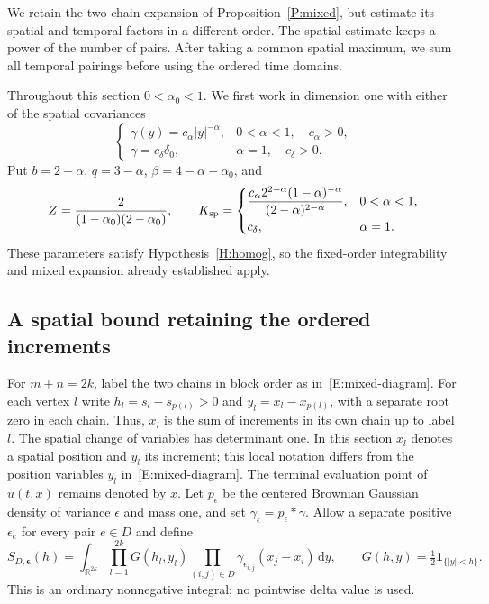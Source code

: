 \documentclass[12pt,oneside,openany]{book}
\numberwithin{equation}{section}
\theoremstyle{nogostyle}
\theoremstyle{definition}
\newcommand{\R}{\mathbb{R}}
\newcommand{\ud}{\,\mathrm{d}}
\begin{document}
We retain the two-chain expansion of Proposition~\ref{P:mixed}, but estimate its
spatial and temporal factors in a different order. The spatial estimate keeps a
power of the number of pairs. After taking a common spatial maximum, we sum all
temporal pairings before using the ordered time domains.

Throughout this section $0 < \alpha_0 < 1$. We first work in dimension one with
either of the spatial covariances
\begin{equation}\label{E:d1-covariances}
  \begin{cases}
    \gamma(y)=c_\alpha|y|^{-\alpha},&0<\alpha<1,\quad c_\alpha>0,\\
    \gamma=c_\delta\delta_0,&\alpha=1,\quad c_\delta>0.
  \end{cases}
\end{equation}
Put $b = 2-\alpha$, $q = 3-\alpha$, $\beta = 4-\alpha-\alpha_0$, and
\begin{equation}\label{E:d1-constants}
  Z=\frac{2}{(1-\alpha_0)(2-\alpha_0)},\qquad
  K_{\rm sp}=
  \begin{cases}
    \displaystyle\frac{c_\alpha 2^{2-\alpha}(1-\alpha)^{-\alpha}}
    {(2-\alpha)^{2-\alpha}},&0<\alpha<1,\\[2mm]
    c_\delta,&\alpha=1.
  \end{cases}
\end{equation}
These parameters satisfy Hypothesis~\ref{H:homog}, so the fixed-order
integrability and mixed expansion already established apply.

\subsection{A spatial bound retaining the ordered increments}

For $m+n = 2k$, label the two chains in block order as in~\eqref{E:mixed-diagram}. For each vertex $l$ write
$h_l = s_l-s_{p(l)} > 0$ and $y_l = x_l-x_{p(l)}$, with a separate root zero
in each chain. Thus, $x_l$ is the sum of increments in its own chain
up to label $l$. The spatial change of variables has determinant one.
In this section $x_l$ denotes a spatial position and $y_l$ its increment; this local
notation differs from the position variables $y_l$
in~\eqref{E:mixed-diagram}. The terminal evaluation point of $u(t,x)$
remains denoted by $x$.
Let $p_\epsilon$ be the centered Brownian Gaussian density of variance
$\epsilon$ and mass one, and set
$\gamma_\epsilon = p_\epsilon*\gamma$. Allow a separate positive
$\epsilon_e$ for every pair $e \in D$ and define
\[
  S_{D,\boldsymbol\epsilon}(h)
  =\int_{\R^{2k}}\prod_{l=1}^{2k}G(h_l,y_l)
  \prod_{(i,j)\in D}\gamma_{\epsilon_{i,j}}(x_j-x_i)\ud y,
  \qquad G(h,y)=\tfrac12\mathbf1_{\{|y|<h\}}.
\]
This is an ordinary nonnegative integral; no pointwise delta value is used.
\end{document}
